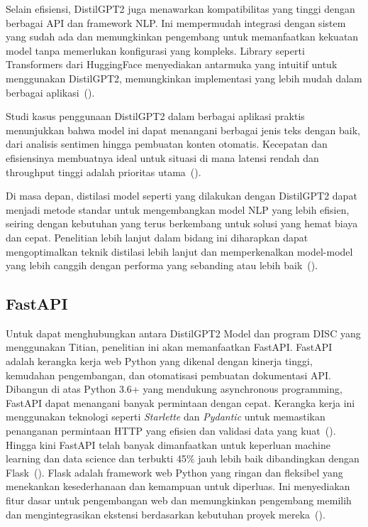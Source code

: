Selain efisiensi, DistilGPT2 juga menawarkan kompatibilitas yang tinggi dengan berbagai API dan framework NLP. Ini mempermudah integrasi dengan sistem yang sudah ada dan memungkinkan pengembang untuk memanfaatkan kekuatan model tanpa memerlukan konfigurasi yang kompleks. Library seperti Transformers dari HuggingFace menyediakan antarmuka yang intuitif untuk menggunakan DistilGPT2, memungkinkan implementasi yang lebih mudah dalam berbagai aplikasi~(\cite{wolf2020}).

Studi kasus penggunaan DistilGPT2 dalam berbagai aplikasi praktis menunjukkan bahwa model ini dapat menangani berbagai jenis teks dengan baik, dari analisis sentimen hingga pembuatan konten otomatis. Kecepatan dan efisiensinya membuatnya ideal untuk situasi di mana latensi rendah dan throughput tinggi adalah prioritas utama~(\cite{brown2020}).

Di masa depan, distilasi model seperti yang dilakukan dengan DistilGPT2 dapat menjadi metode standar untuk mengembangkan model NLP yang lebih efisien, seiring dengan kebutuhan yang terus berkembang untuk solusi yang hemat biaya dan cepat. Penelitian lebih lanjut dalam bidang ini diharapkan dapat mengoptimalkan teknik distilasi lebih lanjut dan memperkenalkan model-model yang lebih canggih dengan performa yang sebanding atau lebih baik~(\cite{clark2020}).

\subsection{FastAPI}

Untuk dapat menghubungkan antara DistilGPT2 Model dan program DISC 
yang menggunakan Titian, penelitian ini akan memanfaatkan FastAPI. 
FastAPI adalah kerangka kerja web Python yang dikenal dengan kinerja 
tinggi, kemudahan pengembangan, dan otomatisasi pembuatan dokumentasi 
API. Dibangun di atas Python 3.6+ yang mendukung asynchronous 
programming, FastAPI dapat menangani banyak permintaan dengan 
cepat. Kerangka kerja ini menggunakan teknologi seperti 
\emph{Starlette} dan \emph{Pydantic} untuk memastikan 
penanganan permintaan HTTP yang efisien dan validasi data 
yang kuat~(\cite{fastapi}). Hingga kini FastAPI telah banyak 
dimanfaatkan untuk keperluan machine learning dan data science 
dan terbukti 45\% jauh lebih baik dibandingkan dengan 
Flask~(\cite{bansal2022}). Flask adalah framework web Python 
yang ringan dan fleksibel yang menekankan kesederhanaan dan 
kemampuan untuk diperluas. Ini menyediakan fitur dasar untuk 
pengembangan web dan memungkinkan pengembang memilih dan 
mengintegrasikan ekstensi berdasarkan kebutuhan 
proyek mereka~(\cite{kotha2023}).

